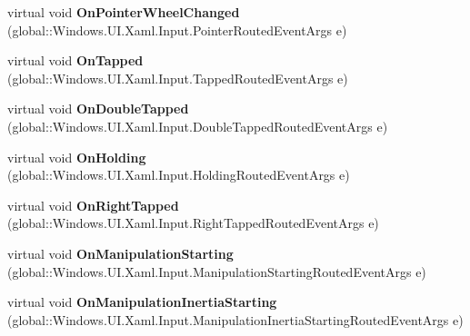 \begin{DoxyCompactItemize}
virtual void {\bfseries On\+Pointer\+Wheel\+Changed} (global\+::\+Windows.\+U\+I.\+Xaml.\+Input.\+Pointer\+Routed\+Event\+Args e)
\item 
\mbox{\label{class_windows_1_1_u_i_1_1_xaml_1_1_controls_1_1_control_a520b4f7b836bf087965e32998fd5898e}} 
virtual void {\bfseries On\+Tapped} (global\+::\+Windows.\+U\+I.\+Xaml.\+Input.\+Tapped\+Routed\+Event\+Args e)
\item 
\mbox{\label{class_windows_1_1_u_i_1_1_xaml_1_1_controls_1_1_control_a3e02cbf66e1030379acbcae595e718b7}} 
virtual void {\bfseries On\+Double\+Tapped} (global\+::\+Windows.\+U\+I.\+Xaml.\+Input.\+Double\+Tapped\+Routed\+Event\+Args e)
\item 
\mbox{\label{class_windows_1_1_u_i_1_1_xaml_1_1_controls_1_1_control_a8cceeae67a7b01f8f18f30b0e6cf83c6}} 
virtual void {\bfseries On\+Holding} (global\+::\+Windows.\+U\+I.\+Xaml.\+Input.\+Holding\+Routed\+Event\+Args e)
\item 
\mbox{\label{class_windows_1_1_u_i_1_1_xaml_1_1_controls_1_1_control_addc7255a46f490ec04cc165962614c99}} 
virtual void {\bfseries On\+Right\+Tapped} (global\+::\+Windows.\+U\+I.\+Xaml.\+Input.\+Right\+Tapped\+Routed\+Event\+Args e)
\item 
\mbox{\label{class_windows_1_1_u_i_1_1_xaml_1_1_controls_1_1_control_a967a18b3578c9d2bd19a72f4a964d3a3}} 
virtual void {\bfseries On\+Manipulation\+Starting} (global\+::\+Windows.\+U\+I.\+Xaml.\+Input.\+Manipulation\+Starting\+Routed\+Event\+Args e)
\item 
\mbox{\label{class_windows_1_1_u_i_1_1_xaml_1_1_controls_1_1_control_a435a48ffc2e72a28d5a8c492fb75ee38}} 
virtual void {\bfseries On\+Manipulation\+Inertia\+Starting} (global\+::\+Windows.\+U\+I.\+Xaml.\+Input.\+Manipulation\+Inertia\+Starting\+Routed\+Event\+Args e)
\item 
\mbox{\label{class_windows_1_1_u_i_1_1_xaml_1_1_controls_1_1_control_aed97aaca4691b6260b928885e95b59a3}} 

\end{DoxyCompactItemize}
